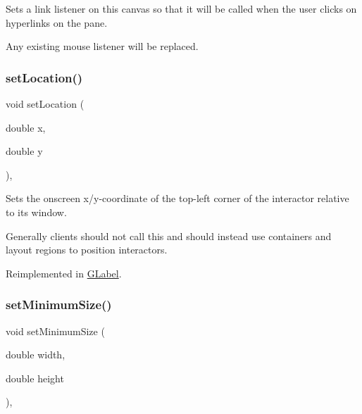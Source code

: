 Sets a link listener on this canvas so that it will be called when the user clicks on hyperlinks on the pane. 

Any existing mouse listener will be replaced. \mbox{\label{classGInteractor_a04594e8ba9b98513a64f1da00dcae18c}} 
\subsubsection{\texorpdfstring{set\+Location()}{setLocation()}}
{\footnotesize\ttfamily void set\+Location (\begin{DoxyParamCaption}\item[{double}]{x,  }\item[{double}]{y }\end{DoxyParamCaption})\hspace{0.3cm}{\ttfamily [virtual]}, {\ttfamily [inherited]}}



Sets the onscreen x/y-\/coordinate of the top-\/left corner of the interactor relative to its window. 

Generally clients should not call this and should instead use containers and layout regions to position interactors. 

Reimplemented in \mbox{\hyperlink{classGLabel_ae3b17c0aeb355dc23c4e4cbf066e81f7}{G\+Label}}.

\mbox{\label{classGInteractor_a0cf428e207b7f22cc08138a90b1b87b2}} 
\subsubsection{\texorpdfstring{set\+Minimum\+Size()}{setMinimumSize()}\hspace{0.1cm}{\footnotesize\ttfamily [1/2]}}
{\footnotesize\ttfamily void set\+Minimum\+Size (\begin{DoxyParamCaption}\item[{double}]{width,  }\item[{double}]{height }\end{DoxyParamCaption})\hspace{0.3cm}{\ttfamily [virtual]}, {\ttfamily [inherited]}}



